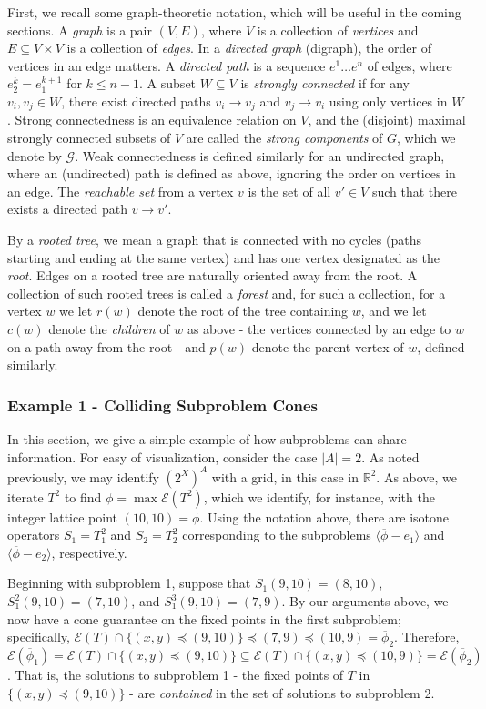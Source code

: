 \documentclass[11pt,reqno]{amsart}
\theoremstyle{definition}
\numberwithin{equation}{section}
\newcommand{\mr}{\mathbb{R}}
\newcommand{\ol}{\overline}
\newcommand{\lag}{\langle}
\newcommand{\rag}{\rangle}
\newcommand{\pre}{\phi}
\newcommand{\prealloc}{(2^X)^A}
\newcommand{\sub}{\subseteq}
\newcommand{\fix}{\mathcal{E}}
\newcommand{\peq}{\preceq}
\newcommand{\toppre}{\ol{\pre}}
\newcommand{\strongc}{\mathcal{G}}
\begin{document}
First, we recall some graph-theoretic notation, which will be useful in the coming sections. A \emph{graph} is a pair $(V,E)$, where $V$ is a collection of \emph{vertices} and $E \sub V \times V$ is a collection of \emph{edges}.
In a \emph{directed graph} (digraph), the order of vertices in an edge matters. 
A \emph{directed path} is a sequence $e^1 \hdots e^n$ of edges, where $e_2^k = e_1^{k+1}$ for $k \leq n-1$. 
A subset $W \sub V$ is \emph{strongly connected} if for any $v_i, v_j \in W$, there exist directed paths $v_i \to v_j$ and $v_j \to v_i$ using only vertices in $W$. 
Strong connectedness is an equivalence relation on $V$, and the (disjoint) maximal strongly connected subsets of $V$ are called the \emph{strong components} of $G$, which we denote by $\strongc$. 
Weak connectedness is defined similarly for an undirected graph, where an (undirected) path is defined as above, ignoring the order on vertices in an edge. 
The \emph{reachable set} from a vertex $v$ is the set of all $v' \in V$ such that there exists a directed path $v \to v'$. 

By a \emph{rooted tree}, we mean a graph that is connected with no cycles (paths starting and ending at the same vertex) and has one vertex designated as the \emph{root}. 
Edges on a rooted tree are naturally oriented away from the root. 
A collection of such rooted trees is called a \emph{forest} and, for such a collection, for a vertex $w$ we let $r(w)$ denote the root of the tree containing $w$, and we let $c(w)$ denote the \emph{children} of $w$ as above - the vertices connected by an edge to $w$ on a path away from the root - and $p(w)$ denote the parent vertex of $w$, defined similarly.  

\subsubsection{Example 1 - Colliding Subproblem Cones}
In this section, we give a simple example of how subproblems can share information.
For easy of visualization, consider the case $|A| = 2$. As noted previously, we may identify $\prealloc$ with a grid, in this case in $\mr^2$.
As above, we iterate $T^2$ to find $\toppre = \max \fix(T^2)$, which we identify, for instance, with the integer lattice point $(10,10) = \toppre$. 
Using the notation above, there are isotone operators $S_1 = T_1^2$ and $S_2 = T_2^2$ corresponding to the subproblems $\lag \toppre - e_1 \rag$ and $\lag \toppre - e_2 \rag$, respectively. 

Beginning with subproblem 1, suppose that $S_1 (9,10) = (8,10)$, $S_1^2 (9,10) = (7,10)$, and $S_1^3 (9,10) = (7,9)$.
By our arguments above, we now have a cone guarantee on the fixed points in the first subproblem; specifically, $\fix(T) \cap \{(x,y) \peq (9,10)\} \peq (7,9) \peq (10,9) = \toppre_2$.
Therefore, $\fix(\toppre_1) = \fix(T) \cap \{(x,y) \peq (9,10)\} \sub \fix(T) \cap \{(x,y) \peq (10,9)\} = \fix(\toppre_2)$. 
That is, the solutions to subproblem 1 - the fixed points of $T$ in $\{(x,y) \peq (9,10)\}$ - are \emph{contained} in the set of solutions to subproblem 2.  
\end{document}
